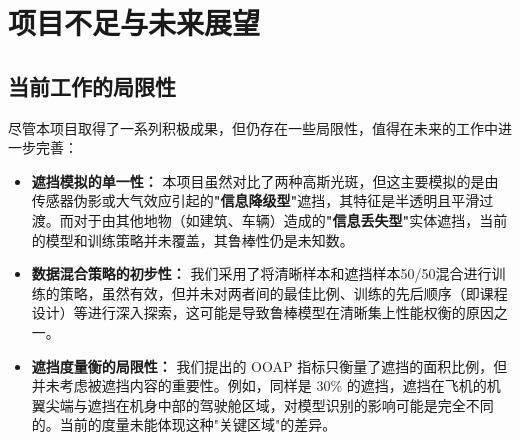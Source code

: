 \documentclass[12pt, a4paper]{report}
\begin{document}
\section{项目不足与未来展望}
\subsection{当前工作的局限性}
尽管本项目取得了一系列积极成果，但仍存在一些局限性，值得在未来的工作中进一步完善：
\begin{itemize}
    \item \textbf{遮挡模拟的单一性：} 本项目虽然对比了两种高斯光斑，但这主要模拟的是由传感器伪影或大气效应引起的\textbf{"信息降级型"}遮挡，其特征是半透明且平滑过渡。而对于由其他地物（如建筑、车辆）造成的\textbf{"信息丢失型"}实体遮挡，当前的模型和训练策略并未覆盖，其鲁棒性仍是未知数。
    \item \textbf{数据混合策略的初步性：} 我们采用了将清晰样本和遮挡样本50/50混合进行训练的策略，虽然有效，但并未对两者间的最佳比例、训练的先后顺序（即课程设计）等进行深入探索，这可能是导致鲁棒模型在清晰集上性能权衡的原因之一。
    \item \textbf{遮挡度量衡的局限性：} 我们提出的 OOAP 指标只衡量了遮挡的面积比例，但并未考虑被遮挡内容的重要性。例如，同样是 30\% 的遮挡，遮挡在飞机的机翼尖端与遮挡在机身中部的驾驶舱区域，对模型识别的影响可能是完全不同的。当前的度量未能体现这种"关键区域"的差异。
\end{itemize}
\end{document}
